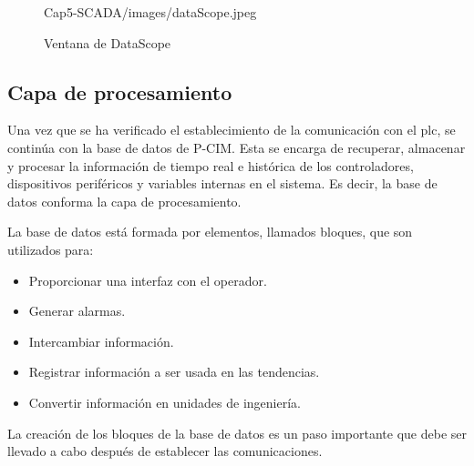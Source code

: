 \begin{itemize}
\begin{figure}[!ht]
	{Cap5-SCADA/images/dataScope.jpeg}
	\caption{Ventana de DataScope}
	\label{fig:dataScope}
  \end{figure}
\end{itemize}


\subsection{Capa de procesamiento}
\label{subsec:CapaProcesamiento}
Una vez que se ha verificado el establecimiento de la comunicación 
con el \gls{plc}, se continúa con la base de datos de P-CIM. Esta se encarga
de recuperar, almacenar y procesar la información de tiempo real e histórica de 
los controladores, dispositivos periféricos y variables internas en el sistema. 
Es decir, la base de datos conforma la capa de procesamiento.

La base de datos está formada por elementos, llamados bloques, que son
utilizados para:
\begin{itemize}
 \item Proporcionar una interfaz con el operador.
 \item Generar alarmas.
 \item Intercambiar información.
 \item Registrar información a ser usada en las tendencias.
 \item Convertir información en unidades de ingeniería.
\end{itemize}
La creación de los bloques de la base de datos es un paso importante que 
debe ser llevado a cabo después de establecer las comunicaciones.

